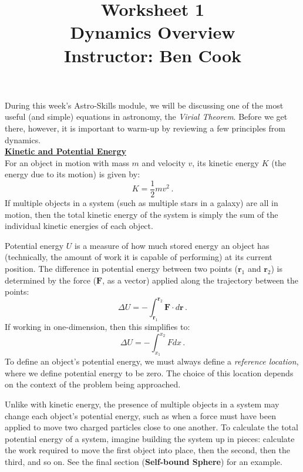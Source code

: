 \documentclass[11pt]{article}
\title{Worksheet 1\\Dynamics Overview\\Instructor: Ben Cook}
\date{}
\renewcommand{\section}[1]{\textbf{\underline{#1}}}
\begin{document}
\maketitle
\thispagestyle{fancy}                   %

\vspace{-0.6in}

During this week's Astro-Skills module, we will be discussing one of
the most useful (and simple) equations in astronomy, the
\textit{Virial Theorem}. Before we get there, however, it is important
to warm-up by reviewing a few principles from dynamics.\\

\section{Kinetic and Potential Energy}\\

For an object in motion with mass $m$ and velocity $v$, its kinetic
energy $K$ (the energy due to its motion) is given by:
\begin{equation}
  K = \frac{1}{2}mv^2\,.
\end{equation}
If multiple objects in a system (such as multiple stars in a galaxy)
are all in motion, then the total kinetic energy of the system is
simply the sum of the individual kinetic energies of each object.

Potential energy $U$ is a measure of how much stored energy an object
has (technically, the amount of work it is capable of performing) at
its current position. The difference in potential energy between two
points ($\mathbf{r}_1$ and $\mathbf{r}_2$) is determined by the force
($\mathbf{F}$, as a vector) applied along the trajectory between the points:
\begin{equation}
  \Delta U = - \int_{\mathbf{r}_1}^{\mathbf{r}_2} \mathbf{F} \cdot d\mathbf{r}\,.
\end{equation}
If working in one-dimension, then this simplifies to:
\begin{equation}
  \Delta U = -\int_{x_1}^{x_2} F dx\,.
\end{equation}
To define an object's potential energy, we must always define a
\textit{reference location}, where we define potential energy to be
zero. The choice of this location depends on the context of the
problem being approached.

Unlike with kinetic energy, the presence of multiple objects in a
system may change each object's potential energy, such as when a force
must have been applied to move two charged particles close to one
another. To calculate the total potential energy of a system, imagine
building the system up in pieces: calculate the work required to move
the first object into place, then the second, then the third, and so
on. See the final section (\textbf{Self-bound Sphere}) for an example.
\end{document}
